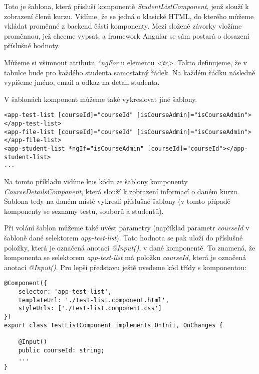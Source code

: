 Toto je šablona, která přísluší komponentě \textit{StudentListComponent}, jenž slouží k zobrazení členů kurzu. Vidíme, že se jedná o klasické HTML, do kterého můžeme vkládat proměnné z backend části komponenty.
Mezi složené závorky vložíme proměnnou, jež chceme vypsat, a framework Angular se sám postará o dosazení příslušné hodnoty.

Můžeme si všimnout atributu \textit{*ngFor} u elementu \textit{<tr>}. Takto definujeme, že v tabulce bude pro každého studenta samostatný řádek.
Na každém řádku následně vypíšeme jméno, email a odkaz na detail studenta.

\vspace{\baselineskip}

V šablonách komponent můžeme také vykreslovat jiné šablony.

\begin{lstlisting}
<app-test-list [courseId]="courseId" [isCourseAdmin]="isCourseAdmin"></app-test-list>
<app-file-list [courseId]="courseId" [isCourseAdmin]="isCourseAdmin"></app-file-list>
<app-student-list *ngIf="isCourseAdmin" [courseId]="courseId"></app-student-list>
...
\end{lstlisting}

Na tomto příkladu vidíme kus kódu ze šablony komponenty \textit{CourseDetailsComponent}, která slouží k zobrazení informací o daném kurzu. Šablona tedy na daném místě vykreslí příslušné šablony (v tomto případě komponenty se seznamy testů, souborů a studentů).

Při volání šablon můžeme také uvést parametry (například parametr \textit{courseId} v šabloně dané selektorem \textit{app-test-list}). Tato hodnota se pak uloží do příslušné položky, která je označená anotací \textit{@Input()}, v dané komponentě. To znamená, že komponenta se selektorem \textit{app-test-list} má položku \textit{courseId}, která je označená anotací \textit{@Input()}. Pro lepší představu ještě uvedeme kód třídy s komponentou:

\lstset{style=typescript}
\begin{lstlisting}
@Component({
	selector: 'app-test-list',
	templateUrl: './test-list.component.html',
	styleUrls: ['./test-list.component.css']
})
export class TestListComponent implements OnInit, OnChanges {

	@Input()
	public courseId: string;
	...
}
\end{lstlisting}

\vspace{\baselineskip}

